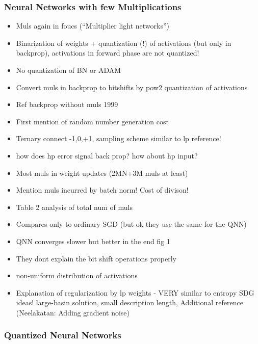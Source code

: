\documentclass{article}
\begin{document}
\subsubsection*{Neural Networks with few Multiplications}
    \begin{itemize}
    \item Muls again in foucs (``Multiplier light networks'')
    \item Binarization of weights + quantization (!) of activations (but only in backprop),
    activations in forward phase are not quantized!
    \item No quantization of BN or ADAM
    \item Convert muls in backprop to bitshifts by pow2 quantization of activations
    \item Ref backprop without muls 1999
    \item First mention of random number generation cost
    \item Ternary connect -1,0,+1, sampling scheme similar to lp reference!
    \item how does hp error signal back prop? how about hp input?
    \item Most muls in weight updates (2MN+3M muls at least)
    \item Mention muls incurred by batch norm! Cost of divison!
    \item Table 2 analysis of total num of muls
    \item Compares only to ordinary SGD (but ok they use the same for the QNN)
    \item QNN converges slower but better in the end fig 1
    \item They dont explain the bit shift operations properly
    \item non-uniform distribution of activations
    \item Explanation of regularization by lp weights - VERY similar to entropy
    SDG ideas! large-basin solution, small description length, Additional reference
    (Neelakatan: Adding gradient noise)
    \end{itemize}

\subsubsection*{Quantized Neural Networks}
\end{document}

